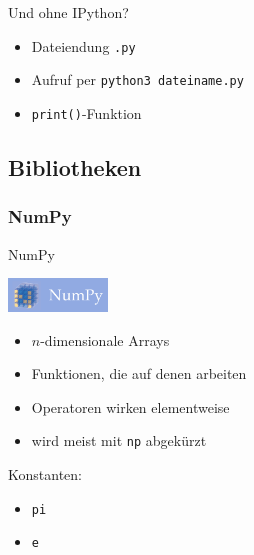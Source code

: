 \begin{frame}[fragile]{Und ohne IPython?}
  \begin{itemize}
    \item Dateiendung \texttt{.py}
    \item Aufruf per \texttt{python3 dateiname.py}
    \item \texttt{print()}-Funktion 
  \end{itemize}
\end{frame}

\subsection{Bibliotheken}
\subsubsection{NumPy}
\begin{frame}{NumPy}
  \begin{center}
    \includegraphics[width=100px]{../Notes/img/numpy.png}
  \end{center}
  \begin{itemize}
    \item $n$-dimensionale Arrays
    \item Funktionen, die auf denen arbeiten
    \item Operatoren wirken elementweise
    \item wird meist mit \texttt{np} abgekürzt
  \end{itemize}

  Konstanten:
  \begin{itemize}
    \item \texttt{pi}
    \item \texttt{e}
  \end{itemize}
\end{frame}

